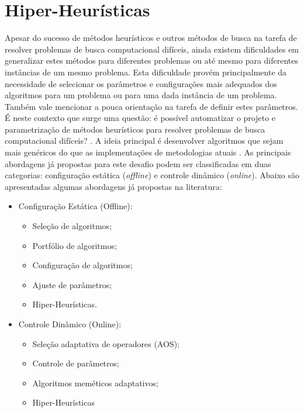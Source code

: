 
\section{Hiper-Heurísticas }
\label{Hiper-Heuristicas}

Apesar do sucesso de métodos heurísticos e outros métodos de busca na tarefa de resolver problemas de busca computacional difíceis, ainda existem dificuldades em generalizar estes métodos para diferentes problemas ou até mesmo para diferentes instâncias de um mesmo problema. Esta dificuldade provém principalmente da necessidade de selecionar os parâmetros e configurações mais adequados dos algoritmos para um problema ou para uma dada instância de um problema. Também vale mencionar a pouca orientação na tarefa de definir estes parâmetros.  É neste contexto que surge uma questão: é possível automatizar o projeto e parametrização de métodos heurísticos para resolver problemas de busca computacional difíceis? \cite{burke2013hyper}. A ideia principal é desenvolver algoritmos que sejam mais genéricos do que as implementações de metodologias atuais \cite{burke2013hyper}. As principais abordagens já propostas para este desafio podem ser classificadas em duas categorias: configuração estática (\textit{offline}) e controle dinâmico (\textit{online}). Abaixo são apresentadas algumas abordagens já propostas na literatura:

\begin{itemize}
	\item Configuração Estática (Offline):
	\begin{itemize}
		\item Seleção de algoritmos;
		\item Portfólio de algoritmos;	
		\item Configuração de algoritmos;
		\item Ajuste de parâmetros;
		\item Hiper-Heurísticas.
	\end{itemize}
	\item Controle Dinâmico (Online):
	\begin{itemize}
		\item Seleção adaptativa de operadores (AOS);
		\item Controle de parâmetros;	
		\item Algoritmos meméticos adaptativos;
		\item Hiper-Heurísticas
	\end{itemize}
	
\end{itemize}


